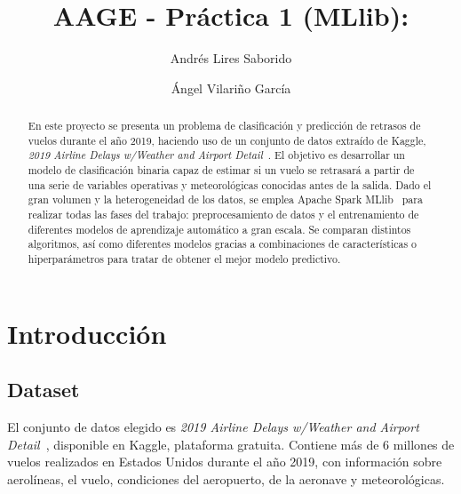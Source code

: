\documentclass[runningheads]{llncs}
\begin{document}
%
\title{AAGE - Práctica 1 (MLlib): }
%
%
\author{Andrés Lires Saborido\and
Ángel Vilariño García}
%
%

%
\maketitle              %
%

\begin{abstract}
En este proyecto se presenta un problema de clasificación y predicción de retrasos de vuelos durante el año 2019, 
haciendo uso de un conjunto de datos extraído de Kaggle, \textit{2019 Airline Delays w/Weather and Airport Detail}~\cite{url_kaggle}. 
El objetivo es desarrollar un modelo de clasificación binaria capaz de estimar si un vuelo se retrasará a partir de una serie de 
variables operativas y meteorológicas conocidas antes de la salida. Dado el gran volumen y la heterogeneidad de los datos, se emplea 
Apache Spark MLlib~\cite{url_spark} para realizar todas las fases del trabajo: preprocesamiento de datos y el entrenamiento de 
diferentes modelos de aprendizaje automático a gran escala. Se comparan distintos algoritmos, así como diferentes modelos gracias 
a combinaciones de características o hiperparámetros para tratar de obtener el mejor modelo predictivo.


\end{abstract}


\section{Introducción}
\subsection{Dataset}
El conjunto de datos elegido es \textit{2019 Airline Delays w/Weather and Airport Detail}~\cite{url_kaggle}, 
disponible en Kaggle, plataforma gratuita. Contiene más de 6 millones de vuelos realizados en 
Estados Unidos durante el año 2019, con información sobre aerolíneas, el vuelo, condiciones del 
aeropuerto, de la aeronave y meteorológicas.
\end{document}
